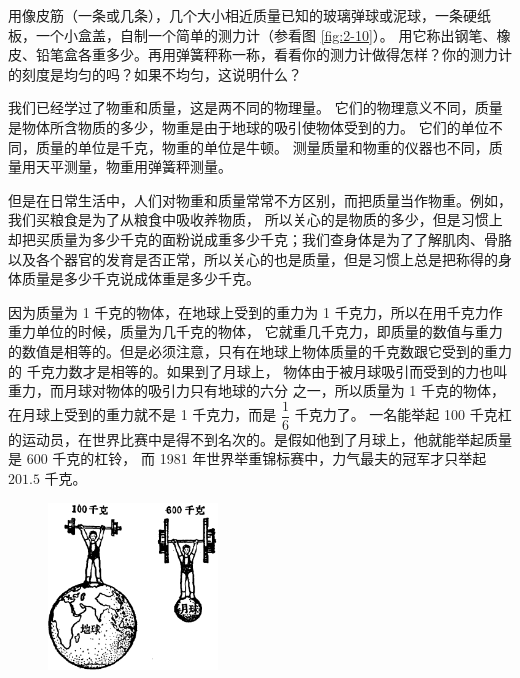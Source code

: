 用像皮筋（一条或几条），几个大小相近质量已知的玻璃弹球或泥球，一条硬纸板，一个小盒盖，自制一个简单的测力计（参看图 \ref{fig:2-10}）。
用它称出钢笔、橡皮、铅笔盒各重多少。再用弹簧秤称一称，看看你的测力计做得怎样？你的测力计的刻度是均匀的吗？如果不均匀，这说明什么？



我们已经学过了物重和质量，这是两不同的物理量。
它们的物理意义不同，质量是物体所含物质的多少，物重是由于地球的吸引使物体受到的力。
它们的单位不同，质量的单位是千克，物重的单位是牛顿。
测量质量和物重的仪器也不同，质量用天平测量，物重用弹簧秤测量。

但是在日常生活中，人们对物重和质量常常不方区别，而把质量当作物重。例如，我们买粮食是为了从粮食中吸收养物质，
所以关心的是物质的多少，但是习惯上却把买质量为多少千克的面粉说成重多少千克；我们查身体是为了了解肌肉、骨胳
以及各个器官的发育是否正常，所以关心的也是质量，但是习惯上总是把称得的身体质量是多少千克说成体重是多少千克。

因为质量为 1 千克的物体，在地球上受到的重力为 1 千克力，所以在用千克力作重力单位的时候，质量为几千克的物体，
它就重几千克力，即质量的数值与重力的数值是相等的。但是必须注意，只有在地球上物体质量的千克数跟它受到的重力的
千克力数才是相等的。如果到了月球上， 物体由于被月球吸引而受到的力也叫重力，而月球对物体的吸引力只有地球的六分
之一，所以质量为 1 千克的物体，在月球上受到的重力就不是 1 千克力，而是 $\dfrac{1}{6}$ 千克力了。
一名能举起 100 千克杠的运动员，在世界比赛中是得不到名次的。是假如他到了月球上，他就能举起质量是 600 千克的杠铃，
而 1981 年世界举重锦标赛中，力气最夫的冠军才只举起 $201.5$ 千克。

\begin{figure}[htbp]
    \centering
    \includegraphics[width=0.4\textwidth]{../pic/czwl1-ch2-11}
    \caption{}\label{fig:2-11}
\end{figure}


